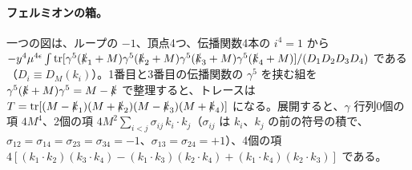 \documentclass[a4paper,10pt]{ltjsarticle}
\begin{document}
\paragraph{フェルミオンの箱。}一つの図は、ループの $-1$、頂点4つ、伝播関数4本の $i^4=1$ から $-y^4\mu^{4\epsilon}\int\mathrm{tr}[\gamma^5(\slashed k_1+M)\gamma^5(\slashed k_2+M)\gamma^5(\slashed k_3+M)\gamma^5(\slashed k_4+M)]/(D_1D_2D_3D_4)$ である（$D_i\equiv D_M(k_i)$）。1番目と3番目の伝播関数の $\gamma^5$ を挟む組を $\gamma^5(\slashed k+M)\gamma^5=M-\slashed k$ で整理すると、トレースは $T=\mathrm{tr}[(M-\slashed k_1)(M+\slashed k_2)(M-\slashed k_3)(M+\slashed k_4)]$ になる。展開すると、$\gamma$ 行列0個の項 $4M^4$、2個の項 $4M^2\sum_{i<j}\sigma_{ij}\,k_i\cdot k_j$（$\sigma_{ij}$ は $k_i$、$k_j$ の前の符号の積で、$\sigma_{12}=\sigma_{14}=\sigma_{23}=\sigma_{34}=-1$、$\sigma_{13}=\sigma_{24}=+1$）、4個の項 $4[(k_1\cdot k_2)(k_3\cdot k_4)-(k_1\cdot k_3)(k_2\cdot k_4)+(k_1\cdot k_4)(k_2\cdot k_3)]$ である。
\end{document}
